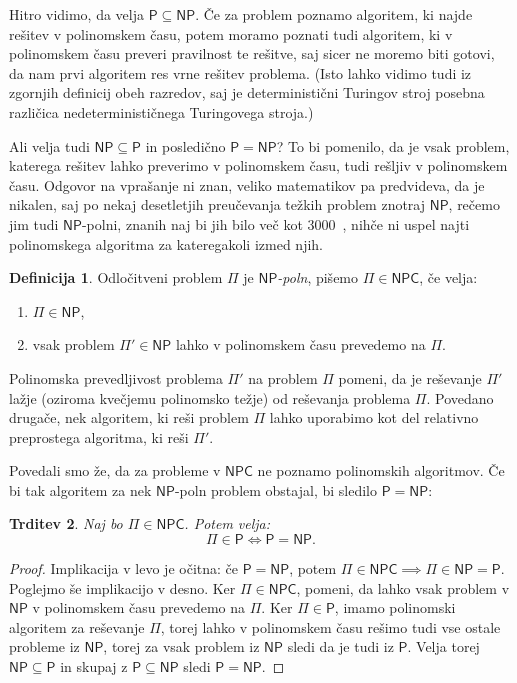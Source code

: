 \documentclass[12pt,a4paper,twoside]{article}
\theoremstyle{definition} %
\newtheorem{definicija}{Definicija}[section]
\theoremstyle{plain} %
\newtheorem{trditev}[definicija]{Trditev}
\numberwithin{equation}{section}  %
\renewcommand{\P}{\ensuremath{\mathsf{P}}}
\newcommand{\NP}{\ensuremath{\mathsf{NP}}}
\newcommand{\NPC}{\ensuremath{\mathsf{NPC}}}
\begin{document}
Hitro vidimo, da velja $\P \subseteq \NP$. Če za problem poznamo algoritem, ki najde rešitev v polinomskem času, potem moramo poznati tudi algoritem, ki v polinomskem času preveri pravilnost te rešitve, saj sicer ne moremo biti gotovi, da nam prvi algoritem res vrne rešitev problema. (Isto lahko vidimo tudi iz zgornjih definicij obeh razredov, saj je deterministični Turingov stroj posebna različica nedeterminističnega Turingovega stroja.)

Ali velja tudi $\NP \subseteq \P$ in posledično $\P = \NP$? To bi pomenilo, da je vsak problem, katerega rešitev lahko preverimo v polinomskem času, tudi rešljiv v polinomskem času. Odgovor na vprašanje ni znan, veliko matematikov pa predvideva, da je nikalen, saj po nekaj desetletjih preučevanja težkih problem znotraj $\NP$, rečemo jim tudi $\NP$-polni, znanih naj bi jih bilo več kot 3000~\cite{wikiPvsNP}, nihče ni uspel najti polinomskega algoritma za kateregakoli izmed njih.

\begin{definicija}
    \label{def:np-poln}
    Odločitveni problem $\Pi$ je \emph{$\NP$-poln}, pišemo $\Pi \in \NPC$, če velja:
    \begin{enumerate}
        \item $\Pi \in \NP$,
        \item vsak problem $\Pi' \in \NP$ lahko v polinomskem času prevedemo na $\Pi$.
    \end{enumerate}
\end{definicija}
Polinomska prevedljivost problema $\Pi'$ na problem $\Pi$ pomeni, da je reševanje $\Pi'$ lažje (oziroma kvečjemu polinomsko težje) od reševanja problema $\Pi$. Povedano drugače, nek algoritem, ki reši problem $\Pi$ lahko uporabimo kot del relativno preprostega algoritma, ki reši $\Pi'$. 

Povedali smo že, da za probleme v $\NPC$ ne poznamo polinomskih algoritmov. Če bi tak algoritem za nek $\NP$-poln problem obstajal, bi sledilo $\P = \NP$:
\begin{trditev}
    Naj bo $\Pi \in \NPC$. Potem velja:
    \[ \Pi \in \P \iff \P = \NP. \]
\end{trditev}
\begin{proof}
    Implikacija v levo je očitna: če $\P = \NP$, potem $\Pi \in \NPC \implies \Pi \in \NP = \P$.
    Poglejmo še implikacijo v desno. Ker $\Pi \in \NPC$, pomeni, da lahko vsak problem v $\NP$ v polinomskem času prevedemo na $\Pi$. Ker $\Pi \in \P$, imamo polinomski algoritem za reševanje $\Pi$, torej lahko v polinomskem času rešimo tudi vse ostale probleme iz $\NP$, torej za vsak problem iz $\NP$ sledi da je tudi iz $\P$. Velja torej $\NP \subseteq \P$ in skupaj z $\P \subseteq \NP$ sledi $\P = \NP$.
\end{proof}
\end{document}
